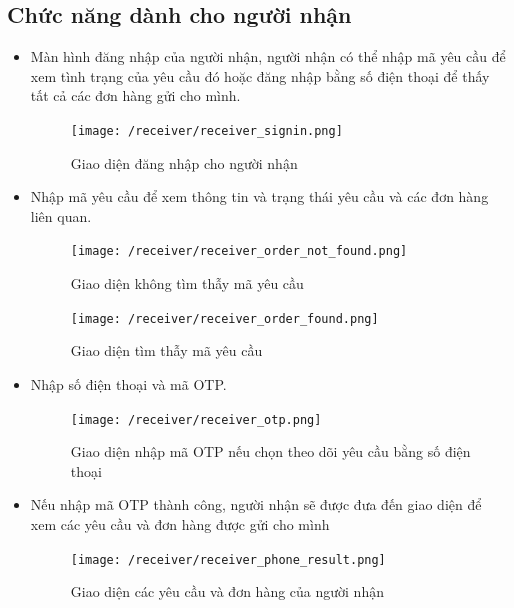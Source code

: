 \subsection{Chức năng dành cho người nhận}
\begin{itemize}
	\item Màn hình đăng nhập của người nhận, người nhận có thể nhập mã yêu cầu để xem tình trạng của yêu cầu đó hoặc đăng nhập bằng số điện thoại để thấy tất cả các đơn hàng gửi cho mình.
	\begin{figure}[H]
		\texttt{[image: /receiver/receiver\_signin.png]}
		\centering
		\caption{Giao diện đăng nhập cho người nhận}
	\end{figure}

	\item Nhập mã yêu cầu để xem thông tin và trạng thái yêu cầu và các đơn hàng liên quan.
	\begin{figure}[H]
		\texttt{[image: /receiver/receiver\_order\_not\_found.png]}
		\centering
		\caption{Giao diện không tìm thẫy mã yêu cầu}
	\end{figure}

	\begin{figure}[H]
		\texttt{[image: /receiver/receiver\_order\_found.png]}
		\centering
		\caption{Giao diện tìm thẫy mã yêu cầu}
	\end{figure}

	\item Nhập số điện thoại và mã OTP.
	\begin{figure}[H]
		\texttt{[image: /receiver/receiver\_otp.png]}
		\centering
		\caption{Giao diện nhập mã OTP nếu chọn theo dõi yêu cầu bằng số điện thoại}
	\end{figure}

	\item Nếu nhập mã OTP thành công, người nhận sẽ được đưa đến giao diện để xem các yêu cầu và đơn hàng được gửi cho mình
	
	\begin{figure}[H]
		\texttt{[image: /receiver/receiver\_phone\_result.png]}
		\centering
		\caption{Giao diện các yêu cầu và đơn hàng của người nhận}
	\end{figure}
\end{itemize}





















